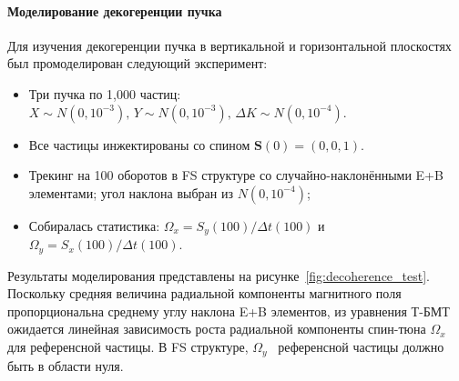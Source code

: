 \documentclass{article}
\newcommand{\bld}{\boldsymbol}
\newcommand{\Wx}{\Omega_x}
\newcommand{\Wy}{\Omega_y}
\newcommand{\Dt}{\Delta t}
\begin{document}
	\paragraph{Моделирование декогеренции пучка}
	Для изучения декогеренции пучка в вертикальной и горизонтальной плоскостях был промоделирован следующий эксперимент:
	\begin{itemize}
		\item Три пучка по 1,000 частиц: $X \sim N(0, 10^{-3}),\, Y \sim N(0, 10^{-3}), \, \Delta K \sim N(0, 10^{-4})$.
		\item Все частицы инжектированы со спином $\bld S(0) = (0, 0, 1)$.
		\item Трекинг на 100 оборотов в FS структуре со случайно-наклонёнными E+B элементами; угол наклона выбран из $N(0, 10^{-4})$;
		\item Собиралась статистика: $\Wx = S_y(100)/\Dt(100)$ и $\Wy = S_x(100)/\Dt(100)$.
	\end{itemize}

	Результаты моделирования представлены на рисунке~\ref{fig:decoherence_test}. Поскольку средняя величина радиальной компоненты магнитного поля пропорциональна среднему углу наклона E+B элементов, из уравнения Т-БМТ ожидается линейная зависимость роста радиальной компоненты спин-тюна $\Wx$ для референсной частицы. В FS структуре, $\Wy$  референсной частицы должно быть в области нуля.
\end{document}
